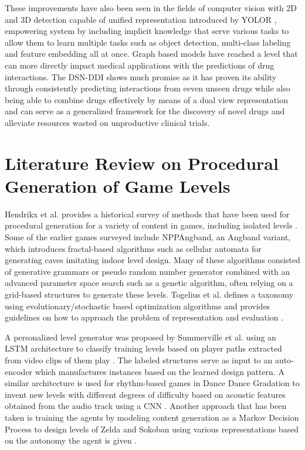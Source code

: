 \documentclass{Configuration_Files/PoliMi3i_thesis}
\begin{document}
These improvements have also been seen in the fields of computer vision with 2D and 3D detection capable of 
unified representation introduced by YOLOR \cite{ChW21}, empowering system by including implicit knowledge 
that serve various tasks to allow them to learn multiple tasks such as object detection, multi-class labeling and 
feature embedding all at once. Graph based models have reached a level that can more directly impact medical 
applications with the predictions of drug interactions. The DSN-DDI \cite{ZiL23} shows much promise as it has 
proven its ability through consistently predicting interactions from eeven unseen drugs while also being able to combine 
drugs effectively by means of a dual view representation and can serve as a generalized framework for the discovery 
of novel drugs and alleviate resources wasted on unproductive clinical trials.

\section{Literature Review on Procedural Generation of Game Levels}
Hendrikx et al. provides a historical survey of methods that have been used for 
procedural generation for a variety of content in games, including isolated levels 
\cite{MaH13}. Some of the earlier games surveyed include NPPAngband, an Angband 
variant, which introduces fractal-based algorithms such as cellular automata for generating 
caves imitating indoor level design. Many of these algorithms consisted of generative 
grammars or pseudo random number generator combined with an advanced 
parameter space search such as a genetic algorithm, often relying on a grid-based 
structures to generate these levels. Togelius et al. defines a taxonomy using 
evolutionary/stochastic based optimization algorithms and provides guidelines on 
how to approach the problem of representation and evaluation \cite{JuT11}.

A personalized level generator was proposed by Summerville et al. using an LSTM 
architecture to classify training levels based on player paths extracted from video clips
 of them play \cite{AdS21}. The labeled structures serve as input 
to an auto-encoder which manufactures instances based on the learned design 
pattern. A similar architecture is used for rhythm-based games in Dance Dance 
Gradation to invent new levels with different degrees of difficulty based on acoustic 
features obtained from the audio track using a CNN \cite{YuT18}. Another approach that has 
been taken is training the agents by modeling content generation as a Markov 
Decision Process to design levels of Zelda and Sokoban using various representations 
based on the autonomy the agent is given \cite{AhK20}.
\end{document}

